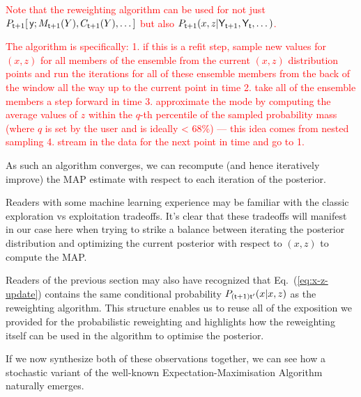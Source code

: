 \textcolor{red}{Note that the reweighting algorithm can be used for not just $P_{{\sf t}+1}[\,{\sf y};M_{{\sf t}+1}(Y),C_{{\sf t}+1}(Y), \dots ]$ but also $P_{{\sf t}+1}(x,z\vert {\sf Y}_{{\sf t}+1}, {\sf Y}_{{\sf t}}, \dots )$.}

\textcolor{red}{The algorithm is specifically: 
1. if this is a refit step, sample new values for $(x,z)$ for all members of the ensemble from the current $(x,z)$ distribution points and run the iterations for all of these ensemble members from the back of the window all the way up to the current point in time
2. take all of the ensemble members a step forward in time
3. approximate the mode by computing the average values of $z$ within the $q$-th percentile of the sampled probability mass (where $q$ is set by the user and is ideally < 68\%) --- this idea comes from nested sampling
4. stream in the data for the next point in time and go to 1.}


As such an algorithm converges, we can recompute (and hence iteratively improve) the MAP estimate with respect to each iteration of the posterior.

Readers with some machine learning experience may be familiar with the classic exploration vs exploitation tradeoffs. It's clear that these tradeoffs will manifest in our case here when trying to strike a balance between iterating the posterior distribution and optimizing the current posterior with respect to $(x,z)$ to compute the MAP. 

Readers of the previous section may also have recognized that Eq.~(\ref{eq:x-z-update}) contains the same conditional probability $P_{({\sf t}+1){\sf t}'}(x\vert x,z)$ as the reweighting algorithm. This structure enables us to reuse all of the exposition we provided for the probabilistic reweighting and highlights how the reweighting itself can be used in the algorithm to optimise the posterior.   

If we now synthesize both of these observations together, we can see how a stochastic variant of the well-known Expectation-Maximisation Algorithm~\cite{hartley1958maximum, dempster1977maximum, murphy2012machine} naturally emerges.


